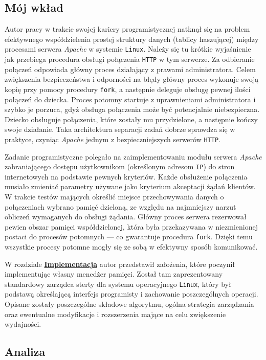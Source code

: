 \documentclass[12pt,a4paper,titlepage,twoside]{mwart}
\begin{document}
\subsection{Mój wkład}

Autor pracy w trakcie swojej kariery programistycznej natknął się na problem
efektywnego współdzielenia prostej struktury danych (tablicy haszującej) między
procesami serwera \textit{Apache} w systemie \texttt{Linux}.  Należy się tu
krótkie wyjaśnienie jak przebiega procedura obsługi połączenia \verb+HTTP+ w
tym serwerze. Za odbieranie połączeń odpowiada główny proces działający z
prawami administratora. Celem zwiększenia bezpieczeństwa i odporności na błędy
główny proces wykonuje swoją kopię przy pomocy procedury \verb+fork+, a
następnie deleguje obsługę pewnej ilości połączeń do dziecka.  Proces potomny
startuje z uprawnieniami administratora i szybko je porzuca, gdyż obsługa
połączenia może być potencjalnie niebezpieczna. Dziecko obsługuje połączenia,
które zostały mu przydzielone, a następnie kończy swoje działanie.  Taka
architektura separacji zadań dobrze sprawdza się w praktyce, czyniąc
\textit{Apache} jednym z bezpieczniejszych serwerów \texttt{HTTP}.

Zadanie programistyczne polegało na zaimplementowaniu modułu serwera
\textit{Apache} zabraniającego dostępu użytkownikom (określonym adresom
\texttt{IP}) do stron internetowych na podstawie pewnych kryteriów. Każde
obsłużenie połączenia musiało zmieniać parametry używane jako kryterium
akceptacji żądań klientów. W trakcie testów mających określić miejsce
przechowywania danych o połączeniach wybrano pamięć dzieloną, ze względu na
najmniejszy narzut obliczeń wymaganych do obsługi żądania. Główny proces
serwera rezerwował pewien obszar pamięci współdzielonej, która była
przekazywana w niezmienionej postaci do procesów potomnych --- co gwarantuje
procedura \verb+fork+. Dzięki temu wszystkie procesy potomne mogły się ze sobą
w efektywny sposób komunikować.

W rozdziale \hyperlink{Implementacja}{\textbf{Implementacja}} autor przedstawił
założenia, które poczynił implementując własny menedżer pamięci. Został tam
zaprezentowany standardowy zarządca sterty dla systemu operacyjnego
\texttt{Linux}, który był podstawą określającą interfejs programisty i
zachowanie poszczególnych operacji. Opisane zostały poszczególne składowe
algorytmu, ogólna strategia zarządzania oraz ewentualne modyfikacje i
rozszerzenia mające na celu zwiększenie wydajności.

\subsection{Analiza}
\end{document}
